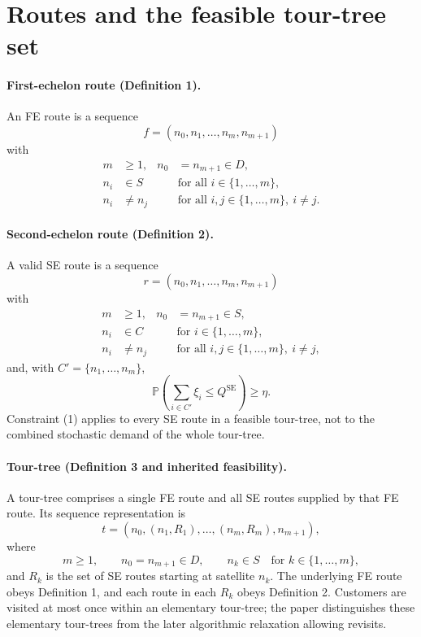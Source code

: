 \documentclass{article}
\begin{document}
\section*{Routes and the feasible tour-tree set}
\paragraph{First-echelon route (Definition 1).}
An FE route is a sequence
\[
f=(n_0,n_1,\ldots,n_m,n_{m+1})
\]
with
\begin{align*}
m&\geq1, & n_0&=n_{m+1}\in D,\\
n_i&\in S &&\text{for all }i\in\{1,\ldots,m\},\\
n_i&\neq n_j &&\text{for all }i,j\in\{1,\ldots,m\},\ i\neq j.
\end{align*}

\paragraph{Second-echelon route (Definition 2).}
A valid SE route is a sequence
\[
r=(n_0,n_1,\ldots,n_m,n_{m+1})
\]
with
\begin{align*}
m&\geq1, & n_0&=n_{m+1}\in S,\\
n_i&\in C &&\text{for }i\in\{1,\ldots,m\},\\
n_i&\neq n_j &&\text{for all }i,j\in\{1,\ldots,m\},\ i\neq j,
\end{align*}
and, with $C'=\{n_1,\ldots,n_m\}$,
\begin{equation}
\mathbb P\left(\sum_{i\in C'}\xi_i\leq Q^{\mathrm{SE}}\right)\geq\eta.
\tag{1}
\end{equation}
Constraint (1) applies to every SE route in a feasible tour-tree, not to the combined stochastic demand of the whole tour-tree.

\paragraph{Tour-tree (Definition 3 and inherited feasibility).}
A tour-tree comprises a single FE route and all SE routes supplied by that FE route. Its sequence representation is
\[
t=(n_0,(n_1,R_1),\ldots,(n_m,R_m),n_{m+1}),
\]
where
\[
m\geq1,\qquad n_0=n_{m+1}\in D,\qquad
n_k\in S\quad\text{for }k\in\{1,\ldots,m\},
\]
and $R_k$ is the set of SE routes starting at satellite $n_k$. The underlying FE route obeys Definition 1, and each route in each $R_k$ obeys Definition 2. Customers are visited at most once within an elementary tour-tree; the paper distinguishes these elementary tour-trees from the later algorithmic relaxation allowing revisits.
\end{document}
